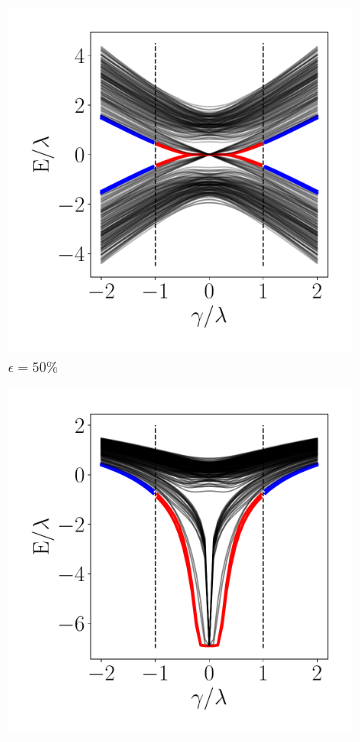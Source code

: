 \begin{figure}[h!]
      \begin{minipage}[h!]{0.9\textwidth}
         \begin{subfigure}[b!]{0.3 \textwidth}
            \caption{$\epsilon = 50\%$}             \includegraphics[width=\textwidth]{Imagenes/Resultados_Hoti_Fractal/bands_square_shh_0.5.pdf}
         \end{subfigure}\hspace*{-0.5em}
         \begin{subfigure}[b!]{0.3 \textwidth}
            \caption*{}
            \includegraphics[width=\textwidth]{Imagenes/Resultados_Hoti_Fractal/bands_square_shh_log0.5.pdf}

\end{subfigure}
\end{minipage}
\end{figure}
